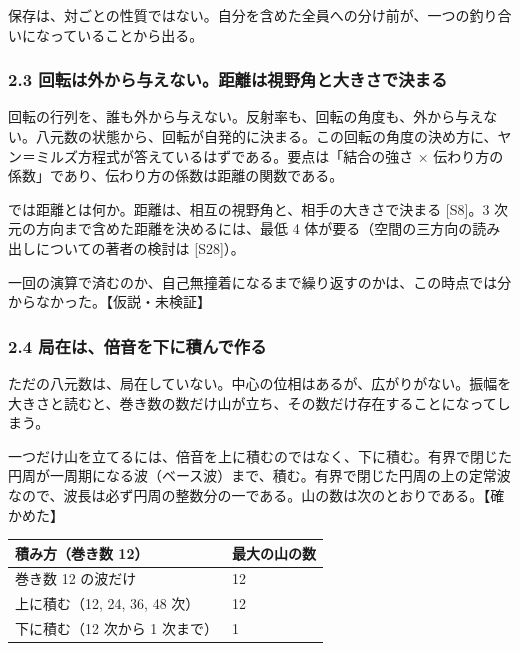\documentclass[
  a4paper,
]{ltjsarticle}
\newcounter{none} %
\begin{document}
保存は、対ごとの性質ではない。自分を含めた全員への分け前が、一つの釣り合いになっていることから出る。

\subsubsection{2.3
回転は外から与えない。距離は視野角と大きさで決まる}\label{ux56deux8ee2ux306fux5916ux304bux3089ux4e0eux3048ux306aux3044ux8dddux96e2ux306fux8996ux91ceux89d2ux3068ux5927ux304dux3055ux3067ux6c7aux307eux308b}

回転の行列を、誰も外から与えない。反射率も、回転の角度も、外から与えない。八元数の状態から、回転が自発的に決まる。この回転の角度の決め方に、ヤン＝ミルズ方程式が答えているはずである。要点は「結合の強さ
× 伝わり方の係数」であり、伝わり方の係数は距離の関数である。

では距離とは何か。距離は、相互の視野角と、相手の大きさで決まる
{[}S8{]}。3 次元の方向まで含めた距離を決めるには、最低 4
体が要る（空間の三方向の読み出しについての著者の検討は {[}S28{]}）。

一回の演算で済むのか、自己無撞着になるまで繰り返すのかは、この時点では分からなかった。【仮説・未検証】

\subsubsection{2.4
局在は、倍音を下に積んで作る}\label{ux5c40ux5728ux306fux500dux97f3ux3092ux4e0bux306bux7a4dux3093ux3067ux4f5cux308b}

ただの八元数は、局在していない。中心の位相はあるが、広がりがない。振幅を大きさと読むと、巻き数の数だけ山が立ち、その数だけ存在することになってしまう。

一つだけ山を立てるには、倍音を上に積むのではなく、下に積む。有界で閉じた円周が一周期になる波（ベース波）まで、積む。有界で閉じた円周の上の定常波なので、波長は必ず円周の整数分の一である。山の数は次のとおりである。【確かめた】

{\def\LTcaptype{none} %
\begin{longtable}[]{@{}ll@{}}
\toprule\noalign{}
積み方（巻き数 12） & 最大の山の数 \\
\midrule\noalign{}
\endhead
\bottomrule\noalign{}
\endlastfoot
巻き数 12 の波だけ & 12 \\
上に積む（12, 24, 36, 48 次） & 12 \\
下に積む（12 次から 1 次まで） & 1 \\
\end{longtable}
}
\end{document}
